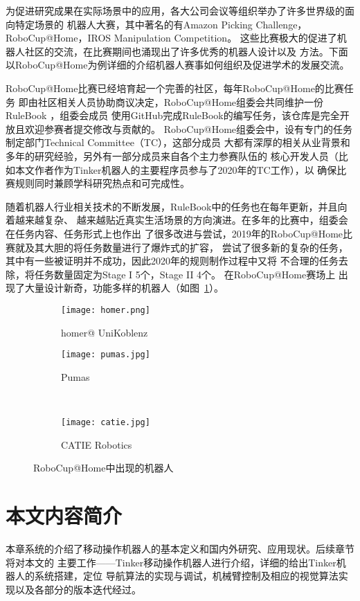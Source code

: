 为促进研究成果在实际场景中的应用，各大公司会议等组织举办了许多世界级的面向特定场景的
机器人大赛，其中著名的有Amazon Picking Challenge\cite{wurman2016amazon}，
RoboCup@Home\cite{wisspeintner2009robocup}，IROS Manipulation Competition\cite{moon2017iros}。
这些比赛极大的促进了机器人社区的交流，在比赛期间也涌现出了许多优秀的机器人设计以及
方法。下面以RoboCup@Home为例详细的介绍机器人赛事如何组织及促进学术的发展交流。

RoboCup@Home比赛已经培育起一个完善的社区，每年RoboCup@Home的比赛任务
即由社区相关人员协助商议决定，RoboCup@Home组委会共同维护一份RuleBook\cite{rulebook}
，组委会成员
使用GitHub完成RuleBook的编写任务，该仓库是完全开放且欢迎参赛者提交修改与贡献的。
RoboCup@Home组委会中，设有专门的任务制定部门Technical Committee（TC），这部分成员
大都有深厚的相关从业背景和多年的研究经验，另外有一部分成员来自各个主力参赛队伍的
核心开发人员（比如本文作者作为Tinker机器人的主要程序员参与了2020年的TC工作），以
确保比赛规则同时兼顾学科研究热点和可完成性。

随着机器人行业相关技术的不断发展，RuleBook中的任务也在每年更新，并且向着越来越复杂、
越来越贴近真实生活场景的方向演进。在多年的比赛中，组委会在任务内容、任务形式上也作出
了很多改进与尝试，2019年的RoboCup@Home比赛就及其大胆的将任务数量进行了爆炸式的扩容，
尝试了很多新的复杂的任务，其中有一些被证明并不成功，因此2020年的规则制作过程中又将
不合理的任务去除，将任务数量固定为Stage I 5个，Stage II 4个。 在RoboCup@Home赛场上
出现了大量设计新奇，功能多样的机器人（如图~\ref{fig:other_teams}）。

\begin{figure}
    \centering
    \begin{minipage}{.45\linewidth}
            \begin{subfigure}[t]{.9\linewidth}
                \texttt{[image: homer.png]}
                \caption{homer@ UniKoblenz}
            \end{subfigure}
    \end{minipage}
    \begin{minipage}{.45\linewidth}
        \begin{subfigure}[t]{.8\linewidth}
            \texttt{[image: pumas.jpg]}
            \caption{Pumas}
        \end{subfigure} \\
        \begin{subfigure}[b]{.8\linewidth}
            \texttt{[image: catie.jpg]}
            \caption{CATIE Robotics}
        \end{subfigure} 
    \end{minipage}
    \caption{RoboCup@Home中出现的机器人}
    \label{fig:other_teams}
\end{figure}

\section{本文内容简介}

本章系统的介绍了移动操作机器人的基本定义和国内外研究、应用现状。后续章节将对本文的
主要工作——Tinker移动操作机器人进行介绍，详细的给出Tinker机器人的系统搭建，定位
导航算法的实现与调试，机械臂控制及相应的视觉算法实现以及各部分的版本迭代经过。





